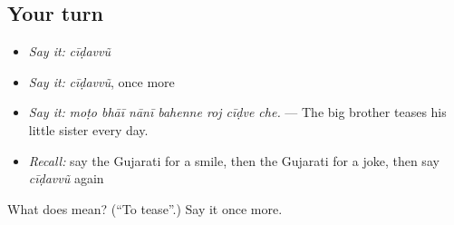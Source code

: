 \subsection*{Your turn}
\begin{itemize}
\raggedright
  \item \emph{Say it:} \emph{cīḍavvũ}
  \item \emph{Say it:} \emph{cīḍavvũ}, once more
  \item \emph{Say it:} \emph{moṭo bhāī nānī bahenne roj cīḍve che.} — The big brother teases his little sister every day.
  \item \emph{Recall:} say the Gujarati for a smile, then the Gujarati for a joke, then say \emph{cīḍavvũ} again
\end{itemize}

\begin{tcolorbox}[breakable,colback=teal!4,colframe=teal!35!black,title={Before you move on}]
What does  mean? (\textquotedblleft{}To tease\textquotedblright{}.) Say it once more.
\end{tcolorbox}
